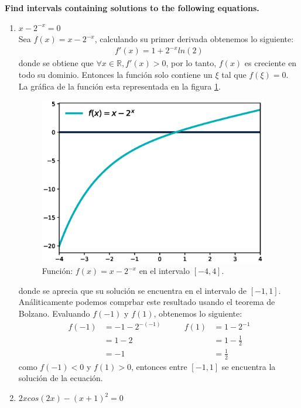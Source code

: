 \item \textbf{Find intervals containing solutions to the following equations.}
\begin{enumerate}
    \item $x-2^{-x}=0$\\
          Sea $f(x)=x-2^{-x}$, calculando su primer derivada obtenemos lo siguiente:
          \begin{align*}
              f'(x)= 1+2^{-x}ln(2)
          \end{align*}
          donde se obtiene que $\forall x  \in \mathbb{R}, f'(x)>0$, por lo tanto, $f(x)$ es creciente en todo su dominio. Entonces la función solo contiene un $\xi$ tal que $f(\xi)=0$. La gráfica de la función esta representada en la figura \ref{fig:problema1a}.
          \begin{figure}[H]
              \centering
              \includegraphics[width=10cm]{Graphics/function_1.eps}
              \caption{Función: $f(x)=x-2^{-x}$ en el intervalo $[-4,4]$.}
              \label{fig:problema1a}
          \end{figure}
          donde se aprecia que su solución se encuentra en el intervalo de $[-1,1]$. Análiticamente podemos comprbar este resultado usando el teorema de Bolzano. Evaluando $f(-1)$ y $f(1)$, obtenemos lo siguiente:
          \begin{align*}
              f(-1) & = -1-2^{-(-1)} & \qquad f(1) & = 1-2^{-1}     \\
                    & =1-2           & \qquad      & =1-\frac{1}{2} \\
                    & =-1            & \qquad      & =\frac{1}{2}
          \end{align*}
          como $f(-1)<0$ y $f(1)>0$, entonces entre $[-1,1]$ se encuentra la solución de la ecuación.
    \item $2xcos(2x)-(x+1)^2=0$\\

\end{enumerate}
